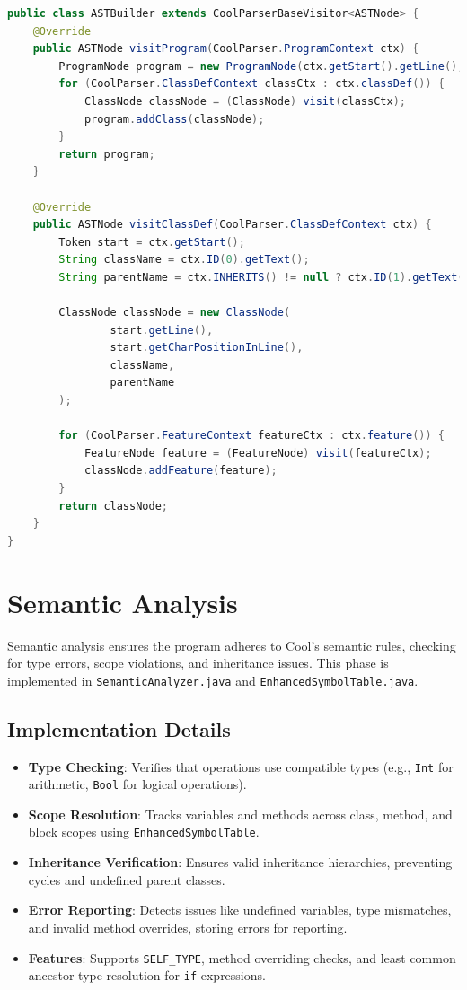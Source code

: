 \documentclass[12pt]{article}
\begin{document}
\begin{lstlisting}[language=Java,caption={Excerpt from ASTBuilder.java}]
public class ASTBuilder extends CoolParserBaseVisitor<ASTNode> {
    @Override
    public ASTNode visitProgram(CoolParser.ProgramContext ctx) {
        ProgramNode program = new ProgramNode(ctx.getStart().getLine(), ctx.getStart().getCharPositionInLine());
        for (CoolParser.ClassDefContext classCtx : ctx.classDef()) {
            ClassNode classNode = (ClassNode) visit(classCtx);
            program.addClass(classNode);
        }
        return program;
    }

    @Override
    public ASTNode visitClassDef(CoolParser.ClassDefContext ctx) {
        Token start = ctx.getStart();
        String className = ctx.ID(0).getText();
        String parentName = ctx.INHERITS() != null ? ctx.ID(1).getText() : null;

        ClassNode classNode = new ClassNode(
                start.getLine(),
                start.getCharPositionInLine(),
                className,
                parentName
        );

        for (CoolParser.FeatureContext featureCtx : ctx.feature()) {
            FeatureNode feature = (FeatureNode) visit(featureCtx);
            classNode.addFeature(feature);
        }
        return classNode;
    }
}
\end{lstlisting}

\section{Semantic Analysis}
Semantic analysis ensures the program adheres to Cool’s semantic rules, checking for type errors, scope violations, and inheritance issues. This phase is implemented in \texttt{SemanticAnalyzer.java} and \texttt{EnhancedSymbolTable.java}.

\subsection{Implementation Details}
\begin{itemize}[itemsep=2pt]
    \item \textbf{Type Checking}: Verifies that operations use compatible types (e.g., \texttt{Int} for arithmetic, \texttt{Bool} for logical operations).
    \item \textbf{Scope Resolution}: Tracks variables and methods across class, method, and block scopes using \texttt{EnhancedSymbolTable}.
    \item \textbf{Inheritance Verification}: Ensures valid inheritance hierarchies, preventing cycles and undefined parent classes.
    \item \textbf{Error Reporting}: Detects issues like undefined variables, type mismatches, and invalid method overrides, storing errors for reporting.
    \item \textbf{Features}: Supports \texttt{SELF\_TYPE}, method overriding checks, and least common ancestor type resolution for \texttt{if} expressions.
\end{itemize}
\end{document}
